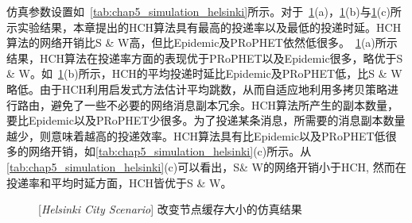 仿真参数设置如\tablename~\ref{tab:chap5_simulation_helsinki}所示。对于\figurename~\ref{fig:chap5_helsinki_buffer}(a)，\ref{fig:chap5_helsinki_buffer}(b)与\ref{fig:chap5_helsinki_buffer}(c)所示实验结果，本章提出的HCH算法具有最高的投递率以及最低的投递时延。HCH算法的网络开销比S \& W高，但比Epidemic及PRoPHET依然低很多。\figurename~\ref{fig:chap5_helsinki_buffer}(a)所示结果，HCH算法在投递率方面的表现优于PRoPHET以及Epidemic很多，略优于S \& W。如\figurename~\ref{fig:chap5_helsinki_buffer}(b)所示，HCH的平均投递时延比Epidemic及PRoPHET低，比S \& W略低。由于HCH利用启发式方法估计平均跳数，从而自适应地利用多拷贝策略进行路由，避免了一些不必要的网络消息副本冗余。HCH算法所产生的副本数量，要比Epidemic以及PRoPHET少很多。为了投递某条消息，所需要的消息副本数量越少，则意味着越高的投递效率。HCH算法具有比Epidemic以及PRoPHET低很多的网络开销，如\figurename\ref{tab:chap5_simulation_helsinki}(c)所示。从\figurename\ref{tab:chap5_simulation_helsinki}(c)可以看出，S\& W的网络开销小于HCH, 然而在投递率和平均时延方面，HCH皆优于S \& W。

\begin{figure}[tbp]
\centering
{}
\caption{[\emph{Helsinki City Scenario}] 改变节点缓存大小的仿真结果}
\label{fig:chap5_helsinki_buffer}
\end{figure}


